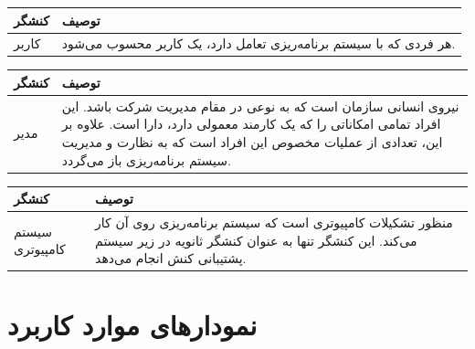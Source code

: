 \begin{table}[H]
	\centering
	\begin{tabular}{|p{3cm}|p{8cm}|}
		\hline
		
		
		کنشگر	& توصیف  \\
		\hline
		کاربر &
		
		هر فردی که با سیستم  برنامه‌ریزی تعامل دارد، یک کاربر محسوب می‌شود.
		\\
		\hline
		
	\end{tabular}
\end{table}


\begin{table}[H]
	\centering
	\begin{tabular}{|p{3cm}|p{8cm}|}
		\hline
		
		
		کنشگر	& توصیف  \\
		\hline
		مدیر &
		
		نیروی انسانی سازمان است که به نوعی در مقام مدیریت شرکت باشد. این افراد تمامی امکاناتی را که یک کارمند معمولی  دارد، دارا است. علاوه بر این، تعدادی از عملیات مخصوص این افراد است که به نظارت و مدیریت سیستم برنامه‌ریزی باز می‌گردد.
		\\
		\hline
		
	\end{tabular}
\end{table}

\begin{table}[H]
	\centering
	\begin{tabular}{|p{3cm}|p{8cm}|}
		\hline
		
		
		کنشگر	& توصیف  \\
		\hline
		سیستم کامپیوتری &
		
		منظور تشکیلات کامپیوتری است که سیستم برنامه‌ریزی روی آن کار می‌کند. این کنشگر تنها به عنوان کنشگر ثانویه در زیر سیستم پشتیبانی کنش انجام می‌دهد.
		\\
		\hline
		
	\end{tabular}
\end{table}


\newpage
\section{نمودارهای موارد کاربرد}

